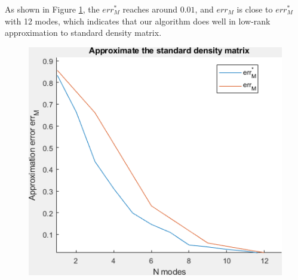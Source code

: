 \documentclass{article}
\numberwithin{equation}{section}
\begin{document}
 As shown in Figure \ref{fig:approx error}, the $err_M^*$ reaches around $0.01$, and $err_M$ is close to $err_M^*$ with 12 modes, which indicates that our algorithm does well in low-rank approximation to standard density matrix.

\begin{figure}[H]
\centering
\includegraphics[width=0.8\linewidth]{figures/approximation.png}
\caption{}

   \label{fig:approx error}

 \end{figure}
\end{document}
